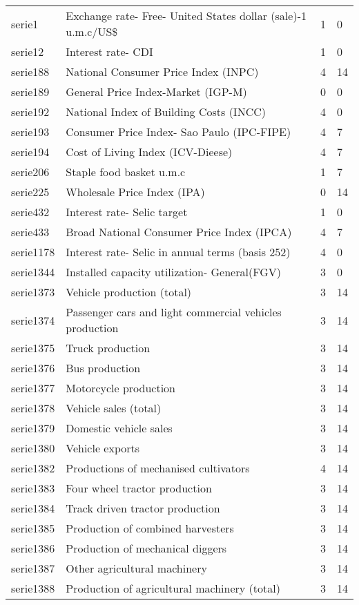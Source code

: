 \documentclass{article}
\begin{document}
\begin{landscape}
\begin{center}
\begin{longtable}{|l|l|l|l|}
serie1 & Exchange rate- Free- United States dollar (sale)-1 u.m.c/US\$ & 1 & 0 \\
serie12 & Interest rate- CDI & 1 & 0 \\
serie188 & National Consumer Price Index (INPC) & 4 & 14 \\
serie189 & General Price Index-Market (IGP-M) & 0 & 0 \\
serie192 & National Index of Building Costs (INCC) & 4 & 0 \\
serie193 & Consumer Price Index- Sao Paulo (IPC-FIPE) & 4 & 7 \\
serie194 & Cost of Living Index (ICV-Dieese) & 4 & 7 \\
serie206 & Staple food basket u.m.c & 1 & 7 \\
serie225 & Wholesale Price Index (IPA) & 0 & 14 \\
serie432 & Interest rate- Selic target & 1 & 0 \\
serie433 & Broad National Consumer Price Index (IPCA) & 4 & 7 \\
serie1178 & Interest rate- Selic in annual terms (basis 252) & 4 & 0 \\
serie1344 & Installed capacity utilization- General(FGV) & 3 & 0 \\
serie1373 & Vehicle production (total) & 3 & 14 \\
serie1374 & Passenger cars and light commercial vehicles production & 3 & 14 \\
serie1375 & Truck production & 3 & 14 \\
serie1376 & Bus production & 3 & 14 \\
serie1377 & Motorcycle production & 3 & 14 \\
serie1378 & Vehicle sales (total) & 3 & 14 \\
serie1379 & Domestic vehicle sales & 3 & 14 \\
serie1380 & Vehicle exports & 3 & 14 \\
serie1382 & Productions of mechanised cultivators & 4 & 14 \\
serie1383 & Four wheel tractor production & 3 & 14 \\
serie1384 & Track driven tractor production & 3 & 14 \\
serie1385 & Production of combined harvesters & 3 & 14 \\
serie1386 & Production of mechanical diggers & 3 & 14 \\
serie1387 & Other agricultural machinery & 3 & 14 \\
serie1388 & Production of agricultural machinery (total) & 3 & 14 \\

\end{longtable}
\end{center}
\end{landscape}
\end{document}
